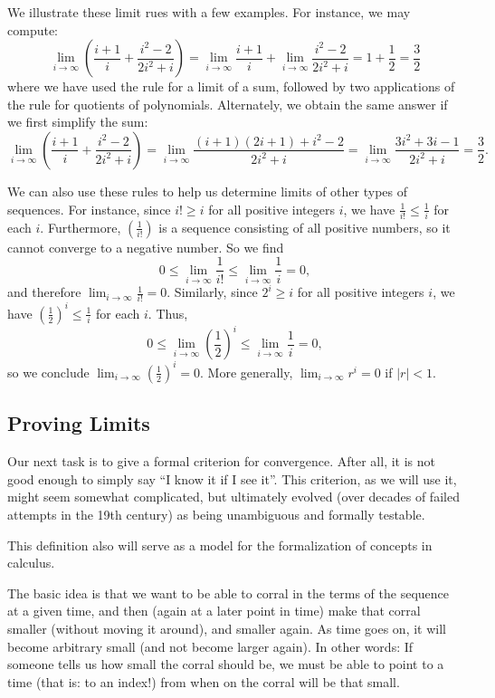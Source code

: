 We illustrate these limit rues with a few examples.
For instance, we may compute:
\[
\lim_{i \to \infty} \left( \frac{i+1}{i} + \frac{i^2-2}{2i^2+i} \right)
= \lim_{i \to \infty}  \frac{i+1}{i} + \lim_{i \to \infty} \frac{i^2-2}{2i^2+i} 
= 1 + \frac{1}{2} 
= \frac{3}{2}
\]
where we have used the rule for a limit of a sum, followed by two applications of the rule for quotients of polynomials.
Alternately, we obtain the same answer if we first simplify the sum:
\[
\lim_{i \to \infty} \left( \frac{i+1}{i} + \frac{i^2-2}{2i^2+i} \right)
= \lim_{i \to \infty} \frac{(i+1)(2i+1)+i^2-2}{2i^2+i}
= \lim_{i \to \infty} \frac{3i^2+3i-1}{2i^2+i}
=\frac{3}{2}.
\]

We can also use these rules to help us determine limits of other types of sequences.
For instance, since $i! \geq i$ for all positive integers $i$, we have $\frac{1}{i!} \leq \frac{1}{i}$ for each $i$. 
Furthermore, $\left( \frac{1}{i!} \right)$ is a sequence consisting of all positive numbers, so it cannot converge to a negative number.
So we find
\[
0 \leq \lim_{i \to \infty} \frac{1}{i!} \leq \lim_{i \to \infty} \frac{1}{i} = 0,
\]
and therefore $\lim_{i \to \infty} \frac{1}{i!} = 0$.
Similarly, since $2^i \geq i$ for all positive integers $i$, we have $\left(\frac{1}{2}\right)^i \leq \frac{1}{i}$ for each $i$.
Thus,
\[
0 \leq \lim_{i \to \infty} \left(\frac{1}{2}\right)^i \leq \lim_{i \to \infty} \frac{1}{i} = 0,
\]
so we conclude $\lim_{i \to \infty} \left(\frac{1}{2}\right)^i = 0$.
More generally, $\lim_{i \to \infty} r^i = 0$ if $|r|<1$.

\subsection{Proving Limits}

Our next task is to give a formal criterion for convergence. After all, it is not good
enough to simply say ``I know it if I see it''. This criterion, as we will use it, might
seem somewhat complicated, but ultimately evolved (over decades of failed attempts in the
19th century) as being unambiguous and formally testable. 

This definition also will serve as a model for the formalization of concepts in calculus.
\medskip

The basic idea is that we want to be able to corral in the terms of the
sequence at a given time, and then (again at a
later point in time) make that corral smaller (without moving it around), and
smaller again.  As time goes on, it will become arbitrary small (and not
become larger again).  In other words: If someone tells us how small the
corral should be, we must be able to point to a time (that is: to an index!)
from when on the corral will be that small.

